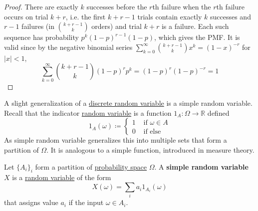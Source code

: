   \begin{proof}
    There are exactly $k$ successes before the $r$th failure when the $r$th failure occurs on trial $k + r$, i.e. the first $k + r - 1$ trials contain exactly $k$ successes and $r - 1$ failures (in $\binom{k+r-1}{k}$ orders) and trial $k + r$ is a failure. Each such sequence has probability $p^k (1-p)^{r-1} (1 - p)$, which gives the PMF. It is valid since by the negative binomial series $\sum_{k=0}^\infty \binom{k+r-1}{k} x^k = (1 - x)^{-r}$ for $|x| < 1$, 
    \begin{equation}
      \sum_{k=0}^\infty \binom{k+r-1}{k} (1-p)^r p^k = (1-p)^r (1 - p)^{-r} = 1
    \end{equation}
  \end{proof}

  A slight generalization of a \hyperref[def:discrete-random-variable]{discrete random variable} is a simple random variable. Recall that the indicator \hyperref[def:random-variable]{random variable} is a function $1_A: \Omega \rightarrow \mathbb{R}$ defined 
  \begin{equation}
    1_A (\omega) \coloneqq \begin{cases} 1 & \text{ if } \omega \in A \\
    0 & \text{ if else } \end{cases}
  \end{equation}
  As simple random variable generalizes this into multiple sets that form a partition of $\Omega$. It is analogous to a simple function, introduced in measure theory. 

  \begin{definition}
    \label{def:simple-random-variable}
    Let $\{A_i\}_i$ form a partition of \hyperref[def:probability-space]{probability space} $\Omega$. A \textbf{simple random variable} $X$ is a \hyperref[def:random-variable]{random variable} of the form 
    \begin{equation}
      X (\omega) = \sum_{i} a_i 1_{A_i} (\omega)
    \end{equation}
    that assigns value $a_i$ if the input $\omega \in A_i$. 
  \end{definition}

